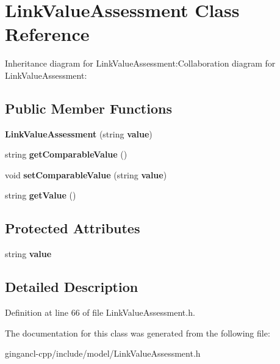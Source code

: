 \section{LinkValueAssessment Class Reference}
\label{classbr_1_1pucrio_1_1telemidia_1_1ginga_1_1ncl_1_1model_1_1link_1_1LinkValueAssessment}
Inheritance diagram for LinkValueAssessment:Collaboration diagram for LinkValueAssessment:\subsection*{Public Member Functions}
\begin{CompactItemize}
\item 
\textbf{LinkValueAssessment} (string {\bf value})\label{classbr_1_1pucrio_1_1telemidia_1_1ginga_1_1ncl_1_1model_1_1link_1_1LinkValueAssessment_b8be83cc820faa5ebb3fe80d0c260ebd}

\item 
string \textbf{getComparableValue} ()\label{classbr_1_1pucrio_1_1telemidia_1_1ginga_1_1ncl_1_1model_1_1link_1_1LinkValueAssessment_f31efc4da880855679813ee6c0acbc88}

\item 
void \textbf{setComparableValue} (string {\bf value})\label{classbr_1_1pucrio_1_1telemidia_1_1ginga_1_1ncl_1_1model_1_1link_1_1LinkValueAssessment_dbd9c7960d3e1decdc0bd9c552fa513e}

\item 
string \textbf{getValue} ()\label{classbr_1_1pucrio_1_1telemidia_1_1ginga_1_1ncl_1_1model_1_1link_1_1LinkValueAssessment_650fbea5b6e5402aba339bf785cf3cc4}

\end{CompactItemize}
\subsection*{Protected Attributes}
\begin{CompactItemize}
\item 
string {\bf value}\label{classbr_1_1pucrio_1_1telemidia_1_1ginga_1_1ncl_1_1model_1_1link_1_1LinkValueAssessment_d9a5de78977ae9e5b497bf647d227aec}

\end{CompactItemize}


\subsection{Detailed Description}




Definition at line 66 of file LinkValueAssessment.h.

The documentation for this class was generated from the following file:\begin{CompactItemize}
\item 
gingancl-cpp/include/model/LinkValueAssessment.h\end{CompactItemize}
